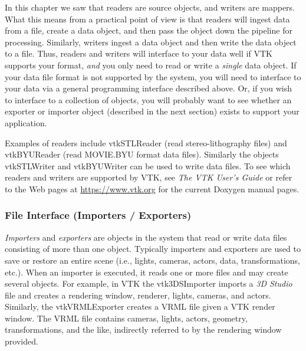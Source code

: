 In this chapter we saw that readers are source objects, and writers are mappers. What this means from a practical point of view is that readers will ingest data from a file, create a data object, and then pass the object down the pipeline for processing. Similarly, writers ingest a data object and then write the data object to a file. Thus, readers and writers will interface to your data well if VTK supports your format, \emph{and} you only need to read or write a \emph{single} data object. If your data file format is not supported by the system, you will need to interface to your data via a general programming interface described above. Or, if you wish to interface to a collection of objects, you will probably want to see whether an exporter or importer object (described in the next section) exists to support your application.

Examples of readers include vtkSTLReader (read stereo-lithography files) and vtkBYUReader (read MOVIE.BYU format data files). Similarly the objects vtkSTLWriter and vtkBYUWriter can be used to write data files. To see which readers and writers are supported by VTK, see \emph{The VTK User's Guide} or refer to the Web pages at \href{https://www.vtk.org}{https://www.vtk.org} for the current Doxygen manual pages.

\subsubsection{File Interface (Importers / Exporters)}
\label{subsubsec:file_interface_importers_exporters}

\emph{Importers} and \emph{exporters} are objects in the system that read or write data files consisting of more than one object. Typically importers and exporters are used to save or restore an entire scene (i.e., lights, cameras, actors, data, transformations, etc.). When an importer is executed, it reads one or more files and may create several objects. For example, in VTK the vtk3DSImporter imports a \emph{3D Studio} file and creates a rendering window, renderer, lights, cameras, and actors. Similarly, the vtkVRMLExporter creates a VRML file given a VTK render window. The VRML file contains cameras, lights, actors, geometry, transformations, and the like, indirectly referred to by the rendering window provided.

